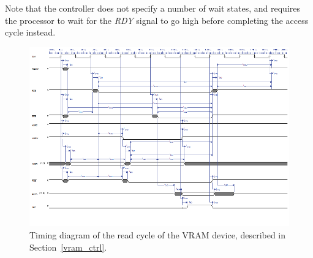\documentclass[titlepage]{scrartcl}
\begin{document}
	Note that the controller does not specify a number of wait states, and requires the processor to wait for the \textit{RDY} signal to go high before completing the access cycle instead.\\
 
	\begin{figure}[h!]
	\vspace{-2cm}
	\centerline{\includegraphics[width=20cm, angle=90, origin=c]{img/vram_read.png}}
		\vspace{1cm}
                	\caption{Timing diagram of the read cycle of the VRAM device, described in Section~\ref{vram_ctrl}.}
               	\label{fig:vram_read}
	\end{figure}

	\clearpage
\end{document}
